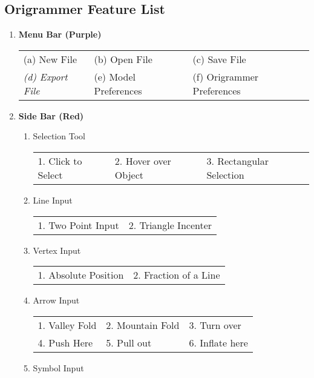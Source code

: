 \subsection{Origrammer Feature List}
\label{sec:featureList}
\begin{enumerate}
\item \textbf{Menu Bar (Purple)}

\begin{tabular}{l l l}
(a) New File & (b) Open File & (c) Save File \\
\emph{(d) Export File}\footnotemark & (e) Model Preferences & (f) Origrammer Preferences \\
\end{tabular}
\item \textbf{Side Bar (Red)}
    \begin{enumerate}
        \item Selection Tool \\
        \begin{tabular}{l l l}
        1. Click to Select & 2. Hover over Object & 3. Rectangular Selection \\
        \end{tabular}
        \item Line Input \\
        \begin{tabular}{l l}
        1. Two Point Input & 2. Triangle Incenter \\
        \end{tabular}
        \item Vertex Input \\
        \begin{tabular}{l l}
        1. Absolute Position & 2. Fraction of a Line \\
        \end{tabular}
        \item Arrow Input \\
        \begin{tabular}{l l l}
        1. Valley Fold & 2. Mountain Fold & 3. Turn over \\
        4. Push Here & 5. Pull out & 6. Inflate here \\
        \end{tabular}
        \item Symbol Input \\
        \begin{tabular}{l l l}

\end{tabular}
\end{enumerate}
\end{enumerate}
